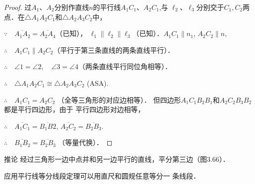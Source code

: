 \begin{proof}
过$A_1$、$A_2$分别作直线$n$的平行线$A_1C_1$、$A_2C_1$,与
$\ell_2$、$\ell_3$分别交于$C_1,C_2$两点．在$\triangle A_1A_2C_1$和$\triangle A_2A_3C_2$中，

$\because\quad \overline{A_1A_2}= \overline{A_2A_4}$（已知），
$\ell_1\parallel \ell_2\parallel \ell_3$（已知）．$A_1C_1\parallel n_1$,  $A_2C_2\parallel n$,

$\therefore\quad A_1C_1\parallel A_2C_2$（平行于第三条直线的两条直线平行）．

$\therefore\quad \angle 1=\angle 2,\quad \angle 3=\angle 4$（两条直线平行同位角相等）．

$\therefore\quad \triangle A_1A_2C_1\cong \triangle A_2A_3C_2$ (ASA).

$\therefore\quad A_1C_1=A_2C_2$ （全等三角形的对应边相等）．
但四边形$A_1C_1B_2B_1$和$A_2C_2B_3B_2$都是平行四边形，由于
平行四边形对边相等，

$\therefore\quad \overline{A_1C_1}=\overline{B_1B2}$, $\overline{A_2C_2}=\overline{B_2B_3}$.

$\therefore\quad \overline{B_1B_2}=\overline{B_2B_3}$ （等量代换）．
\end{proof}    

\begin{blk}
    {推论} 经过三角形一边中点并和另一边平行的直线，平分第三边（图3.66）．
\end{blk}

应用平行线等分线段定理可以用直尺和圆规任意等分一
条线段．

\begin{figure}[htp]\centering
    \begin{minipage}[t]{0.48\textwidth}
    \centering
{}
    \caption{}
    \end{minipage}
    \begin{minipage}[t]{0.48\textwidth}
    \centering
    \caption{}
    \end{minipage}
    \end{figure}

